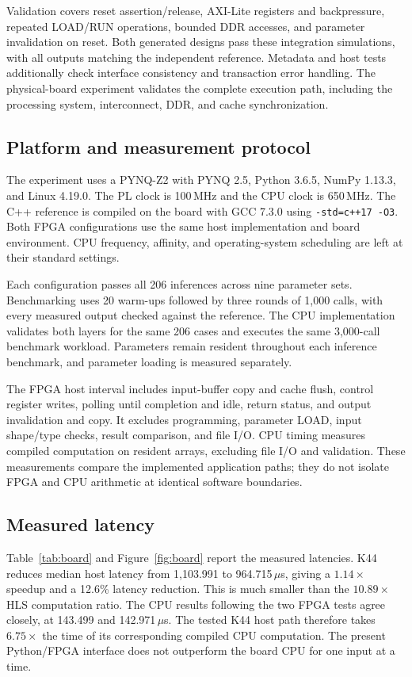 \documentclass[11pt,letterpaper]{article}
\begin{document}
Validation covers reset assertion/release, AXI-Lite registers and backpressure,
repeated LOAD/RUN operations, bounded DDR accesses, and parameter invalidation
on reset. Both generated designs pass these integration simulations, with all
outputs matching the independent reference. Metadata and host tests additionally
check interface consistency and transaction error handling. The physical-board
experiment validates the complete execution path, including the processing
system, interconnect, DDR, and cache synchronization.

\subsection{Platform and measurement protocol}
The experiment uses a PYNQ-Z2 with PYNQ 2.5, Python 3.6.5, NumPy 1.13.3, and
Linux 4.19.0. The PL clock is 100\,MHz and the CPU clock is 650\,MHz. The C++
reference is compiled on the board with GCC 7.3.0 using
\texttt{-std=c++17 -O3}. Both FPGA configurations use the same host implementation
and board environment. CPU frequency, affinity, and operating-system scheduling
are left at their standard settings.

Each configuration passes all 206 inferences across nine parameter sets.
Benchmarking uses 20 warm-ups followed by three rounds of 1,000 calls, with
every measured output checked against the reference. The CPU implementation
validates both layers for the same 206 cases and executes the same 3,000-call
benchmark workload. Parameters remain resident throughout each inference
benchmark, and parameter loading is measured separately.

The FPGA host interval includes input-buffer copy and cache flush, control
register writes, polling until completion and idle, return status, and output
invalidation and copy. It excludes programming, parameter LOAD, input shape/type
checks, result comparison, and file I/O. CPU timing measures compiled computation
on resident arrays, excluding file I/O and validation. These measurements compare
the implemented application paths; they do not isolate FPGA and CPU arithmetic
at identical software boundaries.

\subsection{Measured latency}
Table~\ref{tab:board} and Figure~\ref{fig:board} report the measured latencies.
K44 reduces
median host latency from 1,103.991 to 964.715\,$\mu$s, giving a
$1.14\times$ speedup and a 12.6\% latency reduction. This is much
smaller than the $10.89\times$ HLS computation ratio. The CPU results following
the two FPGA tests agree closely, at 143.499 and 142.971\,$\mu$s.
The tested K44 host path therefore takes $6.75\times$ the time of its
corresponding compiled CPU computation. The present Python/FPGA interface does
not outperform the board CPU for one input at a time.
\end{document}
